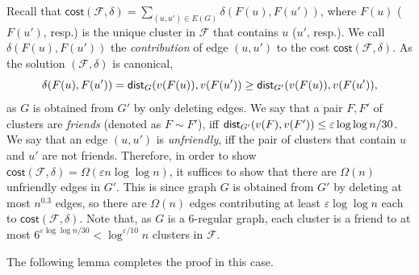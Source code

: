 \documentclass[11pt]{article}
\theoremstyle{definition}
\newcommand{\fset}{{\mathcal{F}}}
\newcommand{\eps}{{\varepsilon}}
\newcommand{\dist}{\textnormal{\textsf{dist}}}
\newcommand\vol{\mathsf{cost}}
\newcounter{note}
\begin{document}
\begin{titlepage}
Recall that $\vol(\fset,\delta)=\sum_{(u,u')\in E(G)}\delta(F(u),F(u'))$, where $F(u)$ ($F(u')$, resp.) is the unique cluster in $\fset$ that contains $u$ ($u'$, resp.). We call $\delta(F(u),F(u'))$ the \emph{contribution} of edge $(u,u')$ to the cost $\vol(\fset,\delta)$.
As the solution $(\fset,\delta)$ is canonical, \[\delta(F(u),F(u'))=\dist_G(v(F(u)),v(F(u'))\ge \dist_{G'}(v(F(u)),v(F(u')),\] 
as $G$ is obtained from $G'$ by only deleting edges.
We say that a pair $F,F'$ of clusters are \emph{friends} (denoted as $F\sim F'$), iff $\dist_{G'}(v(F),v(F'))\le \eps \log \log n/30$.
We say that an edge $(u,u')$ is \emph{unfriendly}, iff the pair of clusters that contain $u$ and $u'$ are not friends.
Therefore, in order to show $\vol(\fset,\delta)=\Omega(\eps n\log\log n)$, it suffices to show that there are $\Omega(n)$ unfriendly edges in $G'$. This is since graph $G$ is obtained from $G'$ by deleting at most $n^{0.3}$ edges, so there are $\Omega(n)$ edges contributing at least $\eps \log\log n$ each to $\vol(\fset,\delta)$.
Note that, as $G$ is a $6$-regular graph, each cluster is a friend to at most $6^{\eps \log \log n/30}<\log^{\eps/10} n$ clusters in $\fset$.

The following lemma completes the proof in this case.





\end{titlepage}
\end{document}
